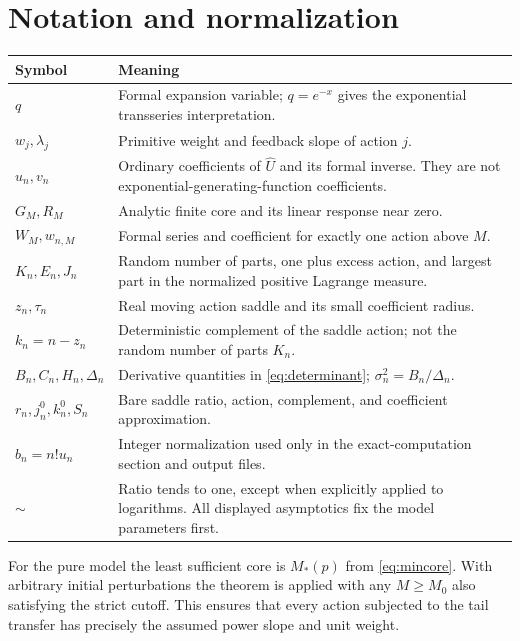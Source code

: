 \documentclass[11pt,a4paper]{article}
\numberwithin{equation}{section}
\theoremstyle{definition}
\theoremstyle{remark}
\newcommand{\Uhat}{\widehat U}\newcommand{\Vhat}{\widehat V}
\begin{document}
\section{Notation and normalization}
\label{app:notation}

\begin{center}\small
\begin{tabular}{>{\raggedright\arraybackslash}p{}>{\raggedright\arraybackslash}p{}}
\toprule
Symbol & Meaning\\
\midrule
$q$ & Formal expansion variable; $q=e^{-x}$ gives the exponential
transseries interpretation.\\[3pt]
$w_j,\lambda_j$ & Primitive weight and feedback slope of action $j$.\\[3pt]
$u_n,v_n$ & Ordinary coefficients of $\Uhat$ and its formal inverse.
They are not exponential-generating-function coefficients.\\[3pt]
$G_M,R_M$ & Analytic finite core and its linear response near zero.\\[3pt]
$W_M,w_{n,M}$ & Formal series and coefficient for exactly one action above
$M$.\\[3pt]
$K_n,E_n,J_n$ & Random number of parts, one plus excess action, and largest
part in the normalized positive Lagrange measure.\\[3pt]
$z_n,\tau_n$ & Real moving action saddle and its small coefficient radius.\\[3pt]
$k_n=n-z_n$ & Deterministic complement of the saddle action; not the random
number of parts $K_n$.\\[3pt]
$B_n,C_n,H_n,\Delta_n$ & Derivative quantities in
\eqref{eq:determinant}; $\sigma_n^2=B_n/\Delta_n$.\\[3pt]
$r_n,j_n^0,k_n^0,S_n$ & Bare saddle ratio, action, complement, and coefficient
approximation.\\[3pt]
$b_n=n!u_n$ & Integer normalization used only in the exact-computation
section and output files.\\[3pt]
$\sim$ & Ratio tends to one, except when explicitly applied to logarithms.
All displayed asymptotics fix the model parameters first.\\
\bottomrule
\end{tabular}
\end{center}

For the pure model the least sufficient core is $M_*(p)$ from
\eqref{eq:mincore}. With arbitrary initial perturbations the theorem is
applied with any $M\ge M_0$ also satisfying the strict cutoff. This ensures
that every action subjected to the tail transfer has precisely the assumed
power slope and unit weight.
\end{document}
